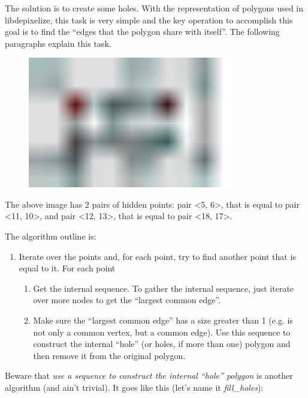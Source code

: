 The solution is to create some holes. With the representation of polygons used
in libdepixelize, this task is very simple and the key operation to accomplish
this goal is to find the ``edges that the polygon share with itself''. The
following paragraphs explain this task.

\begin{figure}[H]
  \centering
  \includegraphics[width=0.8\textwidth]{assets/polygon-holes-conversion.pdf}
\end{figure}

The above image has 2 pairs of hidden points: pair <5, 6>, that is equal to pair
<11, 10>, and pair <12, 13>, that is equal to pair <18, 17>.


The algorithm outline is:

\begin{enumerate}
\item Iterate over the points and, for each point, try to find another point
  that is equal to it. For each point
  \begin{enumerate}
  \item Get the internal sequence. To gather the internal sequence, just iterate
    over more nodes to get the ``largest common edge''.
  \item Make sure the ``largest common edge'' has a size greater than 1 (e.g. is
    not only a common vertex, but a common edge). Use this sequence to construct
    the internal ``hole'' (or holes, if more than one) polygon and then remove
    it from the original polygon.
  \end{enumerate}
\end{enumerate}

Beware that \emph{use a sequence to construct the internal ``hole'' polygon} is
another algorithm (and ain't trivial). It goes like this (let's name it
\emph{fill\_holes}):


